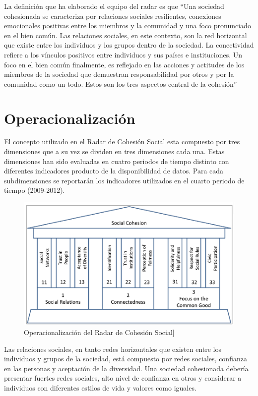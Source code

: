 \documentclass[
  12pt,
]{book}
\begin{document}
La definición que ha elaborado el equipo del radar es que ``Una sociedad
cohesionada se caracteriza por relaciones sociales resilientes,
conexiones emocionales positivas entre los miembros y la comunidad y una
foco pronunciado en el bien común. Las relaciones sociales, en este
contexto, son la red horizontal que existe entre los individuos y los
grupos dentro de la sociedad. La conectividad refiere a los vínculos
positivos entre individuos y sus países e instituciones. Un foco en el
bien común finalmente, es reflejado en las acciones y actitudes de los
miembros de la sociedad que demuestran responsabilidad por otros y por
la comunidad como un todo. Estos son los tres aspectos central de la
cohesión'' \citep{dragolov2013social, delhey_Happier_2016}

\hypertarget{operacionalizaciuxf3n-2}{%
\section{Operacionalización}\label{operacionalizaciuxf3n-2}}

El concepto utilizado en el Radar de Cohesión Social esta compuesto por
tres dimensiones que a su vez se dividen en tres dimensiones cada una.
Estas dimensiones han sido evaluadas en cuatro periodos de tiempo
distinto con diferentes indicadores producto de la disponibilidad de
datos. Para cada subdimensiones se reportarán los indicadores utilizados
en el cuarto periodo de tiempo (2009-2012).

\begin{figure}[H]

{\centering \includegraphics[width=0.75\linewidth]{inputs/images/radar} 

}

\caption{Operacionalización del Radar de Cohesión Social]}\label{fig:radar}
\end{figure}

Las relaciones sociales, en tanto redes horizontales que existen entre
los individuos y grupos de la sociedad, está compuesto por redes
sociales, confianza en las personas y aceptación de la diversidad. Una
sociedad cohesionada debería presentar fuertes redes sociales, alto
nivel de confianza en otros y considerar a individuos con diferentes
estilos de vida y valores como iguales.
\end{document}
